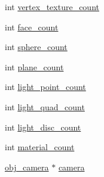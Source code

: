 \begin{DoxyCompactItemize}
int \hyperlink{structobj__scene__data_a4e288061a4b1b178d1b6ed786aace9c3}{vertex\+\_\+texture\+\_\+count}
\item 
int \hyperlink{structobj__scene__data_a963b685135e1ec9318978953785a2306}{face\+\_\+count}
\item 
int \hyperlink{structobj__scene__data_af887af42f5b44b025f21ab5a2a454970}{sphere\+\_\+count}
\item 
int \hyperlink{structobj__scene__data_a9f6da5ed21dc946b77ffcef863f24976}{plane\+\_\+count}
\item 
int \hyperlink{structobj__scene__data_a3a74ddaa5370620722cad16bc2fd0ec8}{light\+\_\+point\+\_\+count}
\item 
int \hyperlink{structobj__scene__data_a785a4b7a965ed5b5d1d89e572964cde3}{light\+\_\+quad\+\_\+count}
\item 
int \hyperlink{structobj__scene__data_ac408db28b6d3821348cd2385b4b64dae}{light\+\_\+disc\+\_\+count}
\item 
int \hyperlink{structobj__scene__data_a51b162f8c0fad5464fc767f5a6fe0881}{material\+\_\+count}
\item 
\hyperlink{structobj__camera}{obj\+\_\+camera} $\ast$ \hyperlink{structobj__scene__data_a54766e9e185b9a668ebb1d41aa105eb6}{camera}
\end{DoxyCompactItemize}


